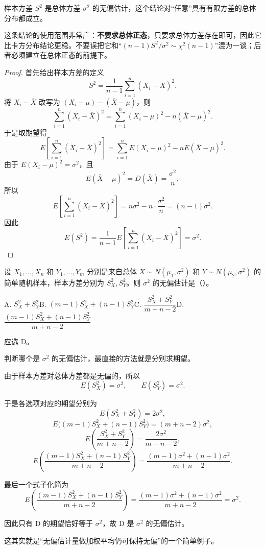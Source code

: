 ﻿\documentclass[lang=cn,11pt]{elegantbook}
\begin{document}
\begin{proposition}[样本方差的无偏性]\label{prop:sample-variance-unbiased}
    样本方差 $S^2$ 是总体方差 $\sigma^2$ 的无偏估计，这个结论对“任意”具有有限方差的总体分布都成立。
\end{proposition}
\begin{note}
这条结论的使用范围非常广：\textbf{不要求总体正态}，只要求总体方差存在即可，因此它比卡方分布结论更稳。不要误把它和“\((n-1)S^2/\sigma^2\sim\chi^2(n-1)\)”混为一谈；后者必须建立在总体正态的前提下。
\end{note}
\begin{proof}
首先给出样本方差的定义
\[
S^2=\frac{1}{n-1}\sum_{i=1}^n (X_i-\overline{X})^2.
\]
将 \(X_i-\overline{X}\) 改写为 \((X_i-\mu)-(\overline{X}-\mu)\)，则
\[
\sum_{i=1}^n (X_i-\overline{X})^2
=\sum_{i=1}^n (X_i-\mu)^2-n(\overline{X}-\mu)^2.
\]
于是取期望得
\[
E\!\left[\sum_{i=1}^n (X_i-\overline{X})^2\right]
=\sum_{i=1}^n E(X_i-\mu)^2-nE(\overline{X}-\mu)^2.
\]
由于 \(E(X_i-\mu)^2=\sigma^2\)，且
\[
E(\overline{X}-\mu)^2=D(\overline{X})=\frac{\sigma^2}{n},
\]
所以
\[
E\!\left[\sum_{i=1}^n (X_i-\overline{X})^2\right]
=n\sigma^2-n\cdot\frac{\sigma^2}{n}=(n-1)\sigma^2.
\]
因此
\[
E(S^2)=\frac{1}{n-1}E\!\left[\sum_{i=1}^n (X_i-\overline{X})^2\right]=\sigma^2.
\]
\end{proof}

\begin{exercise}\label{exer:7-sigma2-unbiased}
设 \(X_1, \dots, X_n\) 和 \(Y_1, \dots, Y_m\) 分别是来自总体 \(X \sim N(\mu_1, \sigma^2)\) 和 \(Y \sim N(\mu_2, \sigma^2)\) 的简单随机样本，样本方差分别为 \(S_X^2, S_Y^2\)。则 \(\sigma^2\) 的无偏估计是（\quad）。\par
A. \(S_X^2 + S_Y^2\)\quad B. \((m-1)S_X^2 + (n-1)S_Y^2\)\quad C. \(\dfrac{S_X^2+S_Y^2}{m+n-2}\)\quad D. \(\dfrac{(m-1)S_X^2+(n-1)S_Y^2}{m+n-2}\)
\end{exercise}
\begin{solution}
应选 D。

判断哪个是 \(\sigma^2\) 的无偏估计，最直接的方法就是分别求期望。

由于样本方差对总体方差都是无偏的，所以
\[
E(S_X^2)=\sigma^2,\qquad E(S_Y^2)=\sigma^2.
\]

于是各选项对应的期望分别为
\[
E(S_X^2+S_Y^2)=2\sigma^2,
\]
\[
E\!\bigl((m-1)S_X^2+(n-1)S_Y^2\bigr)=(m+n-2)\sigma^2,
\]
\[
E\!\left(\frac{S_X^2+S_Y^2}{m+n-2}\right)=\frac{2\sigma^2}{m+n-2},
\]
\[
E\!\left(\frac{(m-1)S_X^2+(n-1)S_Y^2}{m+n-2}\right)
=\frac{(m-1)\sigma^2+(n-1)\sigma^2}{m+n-2}.
\]

最后一个式子化简为
\[
E\!\left(\frac{(m-1)S_X^2+(n-1)S_Y^2}{m+n-2}\right) = \frac{(m-1)\sigma^2+(n-1)\sigma^2}{m+n-2} = \sigma^2.
\]

因此只有 D 的期望恰好等于 \(\sigma^2\)，故 D 是 \(\sigma^2\) 的无偏估计。

这其实就是“无偏估计量做加权平均仍可保持无偏”的一个简单例子。
\end{solution}
\end{document}
